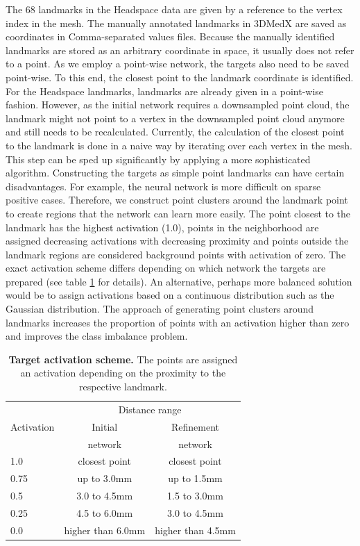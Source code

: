 \documentclass[class=article, crop=false]{standalone}
\begin{document}
The 68 landmarks in the Headspace data are given by a reference to the vertex index in the mesh. The manually annotated landmarks in 3DMedX are saved as coordinates in Comma-separated values files. Because the manually identified landmarks are stored as an arbitrary coordinate in space, it usually does not refer to a point. As we employ a point-wise network, the targets also need to be saved point-wise. To this end, the closest point to the landmark coordinate is identified. For the Headspace landmarks, landmarks are already given in a point-wise fashion. However, as the initial network requires a downsampled point cloud, the landmark might not point to a vertex in the downsampled point cloud anymore and still needs to be recalculated. Currently, the calculation of the closest point to the landmark is done in a naive way by iterating over each vertex in the mesh. This step can be sped up significantly by applying a more sophisticated algorithm. Constructing the targets as simple point landmarks can have certain disadvantages. For example, the neural network is more difficult on sparse positive cases. Therefore, we construct point clusters around the landmark point to create regions that the network can learn more easily. The point closest to the landmark has the highest activation (1.0), points in the neighborhood are assigned decreasing activations with decreasing proximity and points outside the landmark regions are considered background points with activation of zero. The exact activation scheme differs depending on which network the targets are prepared (see table \ref{tab:activation-scheme} for details). An alternative, perhaps more balanced solution would be to assign activations based on a continuous distribution such as the Gaussian distribution. The approach of generating point clusters around landmarks increases the proportion of points with an activation higher than zero and improves the class imbalance problem.

\begin{table}[]
\centering
\begin{tabular}[t]{lcc}\toprule
 & \multicolumn{2}{c}{Distance range} \\
\cmidrule(lr){2-3}
Activation & Initial & Refinement\\
& network & network\\
\hline
1.0        & closest point  & closest point    \\
0.75       & up to 3.0mm & up to 1.5mm    \\
0.5        & 3.0 to 4.5mm & 1.5 to 3.0mm   \\
0.25       & 4.5 to 6.0mm & 3.0 to 4.5mm  \\
0.0       & higher than 6.0mm & higher than 4.5mm  \\\bottomrule
\end{tabular}
\caption{\textbf{Target activation scheme.} The points are assigned an activation depending on the proximity to the respective landmark.}
\label{tab:activation-scheme}
\end{table}
\end{document}
